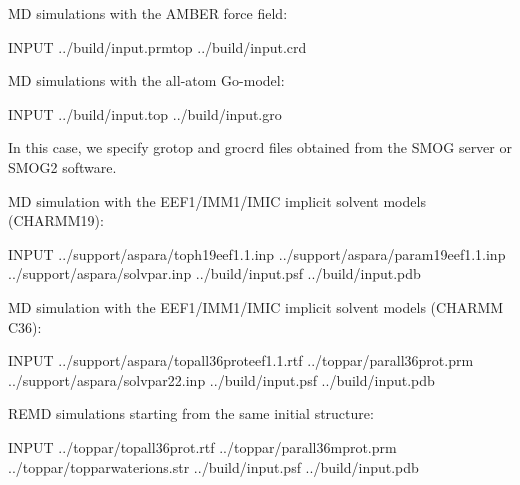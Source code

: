 \documentclass[a4paper,11pt,oneside,english]{sphinxmanual}
\begin{document}
MD simulations with the AMBER force field:

\begin{sphinxVerbatim}[commandchars=\\\{\}]
\PYG{o}{[}INPUT\PYG{o}{]}
  ../build/input.prmtop
  ../build/input.crd
\end{sphinxVerbatim}

MD simulations with the all-atom Go-model:

\begin{sphinxVerbatim}[commandchars=\\\{\}]
\PYG{o}{[}INPUT\PYG{o}{]}
  ../build/input.top
  ../build/input.gro
\end{sphinxVerbatim}

In this case, we specify grotop and grocrd files obtained from the SMOG server or SMOG2 software.

MD simulation with the EEF1/IMM1/IMIC implicit solvent models (CHARMM19):

\begin{sphinxVerbatim}[commandchars=\\\{\}]
\PYG{o}{[}INPUT\PYG{o}{]}
   ../support/aspara/toph19\PYGZus{}eef1.1.inp
   ../support/aspara/param19\PYGZus{}eef1.1.inp
  ../support/aspara/solvpar.inp
   ../build/input.psf
   ../build/input.pdb
\end{sphinxVerbatim}

MD simulation with the EEF1/IMM1/IMIC implicit solvent models (CHARMM C36):

\begin{sphinxVerbatim}[commandchars=\\\{\}]
\PYG{o}{[}INPUT\PYG{o}{]}
   ../support/aspara/top\PYGZus{}all36\PYGZus{}prot\PYGZus{}eef1.1.rtf
   ../toppar/par\PYGZus{}all36\PYGZus{}prot.prm
  ../support/aspara/solvpar22.inp
   ../build/input.psf
   ../build/input.pdb
\end{sphinxVerbatim}

REMD simulations starting from the same initial structure:

\begin{sphinxVerbatim}[commandchars=\\\{\}]
\PYG{o}{[}INPUT\PYG{o}{]}
  ../toppar/top\PYGZus{}all36\PYGZus{}prot.rtf
  ../toppar/par\PYGZus{}all36m\PYGZus{}prot.prm
  ../toppar/toppar\PYGZus{}water\PYGZus{}ions.str
  ../build/input.psf
  ../build/input.pdb
\end{sphinxVerbatim}
\end{document}
